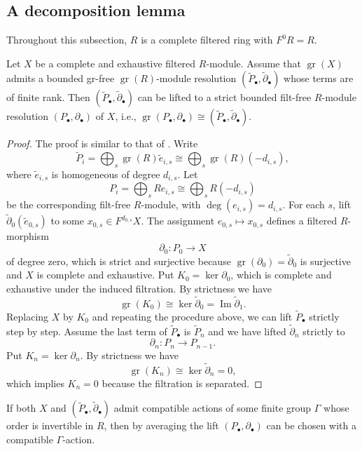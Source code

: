 \documentclass[11pt,a4paper]{article} %
\def\deg{\operatorname{deg}}
\def\gr{\operatorname{gr}}
\def\Im{\operatorname{Im}}
\begin{document}
\subsection{A decomposition lemma}

Throughout this subsection, $R$ is a complete filtered ring with $F^0R=R$.

\begin{lemma}\label{lem:resolution-lifting}
    Let $X$ be a complete and exhaustive filtered $R$-module. Assume that $\gr(X)$ admits a bounded gr-free $\gr(R)$-module resolution $(\widetilde{P}_{\bullet},\widetilde{\partial}_{\bullet})$ whose terms are of finite rank. Then $(\widetilde{P}_{\bullet},\widetilde{\partial}_{\bullet})$ can be lifted to a strict bounded filt-free $R$-module resolution $(P_{\bullet},\partial_{\bullet})$ of $X$, i.e., $\gr(P_{\bullet},\partial_{\bullet})\cong (\widetilde{P}_{\bullet},\widetilde{\partial}_{\bullet})$.
\end{lemma}

\begin{proof}
The proof is similar to that of \cite[Corollary I.7.2.9]{LvO96}.
Write 
\[
\widetilde{P}_i
=\bigoplus_s\gr(R)\widetilde{e}_{i,s}\cong\bigoplus_s\gr(R)(-d_{i,s}),
\]
where $\widetilde{e}_{i,s}$ is homogeneous of degree $d_{i,s}$. Let 
\[
P_i=\bigoplus_sR e_{i,s}\cong\bigoplus_sR(-d_{i,s})
\]
be the corresponding filt-free $R$-module, with
$\deg(e_{i,s})=d_{i,s}$. For each $s$, lift $\widetilde\partial_0(\widetilde{e}_{0,s})$ to some $x_{0,s}\in F^{d_{0,s}}X$. The assignment $e_{0,s}\mapsto x_{0,s}$ defines a filtered $R$-morphism 
\[
\partial_0:P_0\longrightarrow X
\]
of degree zero, which is strict and surjective because $\gr(\partial_0)=\widetilde\partial_0$ is surjective and $X$ is complete and exhaustive. Put $K_0=\ker\partial_0$, which is complete and exhaustive under the induced filtration. By strictness we have 
\[
\gr(K_0)\cong\ker\widetilde\partial_0
=\Im\widetilde\partial_1.
\]
Replacing $X$ by $K_0$ and repeating the procedure above, we can lift $\widetilde{P}_{\bullet}$ strictly step by step. Assume the last term of $\widetilde{P}_{\bullet}$ is $\widetilde{P}_n$ and we have lifted $\widetilde\partial_n$ strictly to 
\[
\partial_n:P_n\longrightarrow P_{n-1}.
\]
Put $K_n=\ker\partial_n$. By strictness we have 
\[
\gr(K_n)\cong\ker\widetilde\partial_n=0,
\]
which implies $K_n=0$ because the filtration is separated.
\end{proof}

\begin{remark}\label{rmk:H-compatible}
    If both $X$ and $(\widetilde{P}_{\bullet},\widetilde{\partial}_{\bullet})$ admit compatible actions of some finite group $\Gamma$ whose order is invertible in $R$, then by averaging the lift $(P_{\bullet},\partial_{\bullet})$ can be chosen with a compatible $\Gamma$-action. 
\end{remark}
\end{document}
